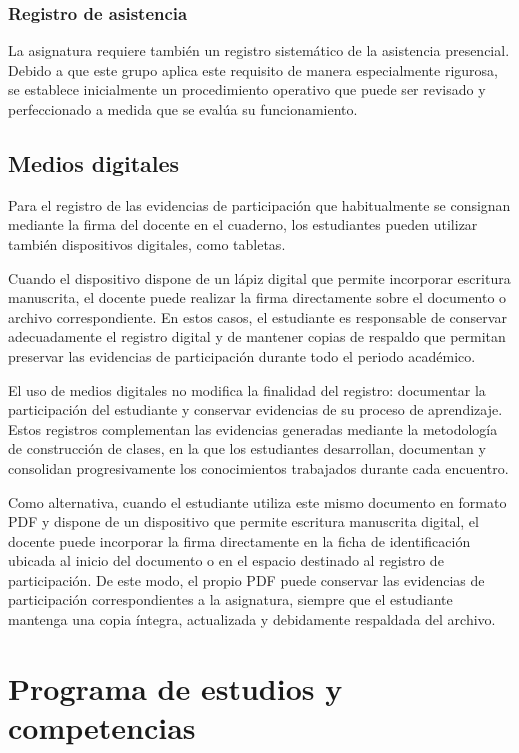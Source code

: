 \documentclass[12pt,a4paper]{article}
\begin{document}
\subsubsection{Registro de asistencia}

La asignatura requiere también un registro sistemático de la asistencia presencial. Debido a que este grupo aplica este requisito de manera especialmente rigurosa, se establece inicialmente un procedimiento operativo que puede ser revisado y perfeccionado a medida que se evalúa su funcionamiento.

\subsection{Medios digitales}

Para el registro de las evidencias de participación que habitualmente se consignan mediante la firma del docente en el cuaderno, los estudiantes pueden utilizar también dispositivos digitales, como tabletas.

Cuando el dispositivo dispone de un lápiz digital que permite incorporar escritura manuscrita, el docente puede realizar la firma directamente sobre el documento o archivo correspondiente. En estos casos, el estudiante es responsable de conservar adecuadamente el registro digital y de mantener copias de respaldo que permitan preservar las evidencias de participación durante todo el periodo académico.

El uso de medios digitales no modifica la finalidad del registro: documentar la participación del estudiante y conservar evidencias de su proceso de aprendizaje. Estos registros complementan las evidencias generadas mediante la metodología de construcción de clases, en la que los estudiantes desarrollan, documentan y consolidan progresivamente los conocimientos trabajados durante cada encuentro.

Como alternativa, cuando el estudiante utiliza este mismo documento en formato PDF y dispone de un dispositivo que permite escritura manuscrita digital, el docente puede incorporar la firma directamente en la ficha de identificación ubicada al inicio del documento o en el espacio destinado al registro de participación. De este modo, el propio PDF puede conservar las evidencias de participación correspondientes a la asignatura, siempre que el estudiante mantenga una copia íntegra, actualizada y debidamente respaldada del archivo.

\section{Programa de estudios y competencias}
\end{document}
